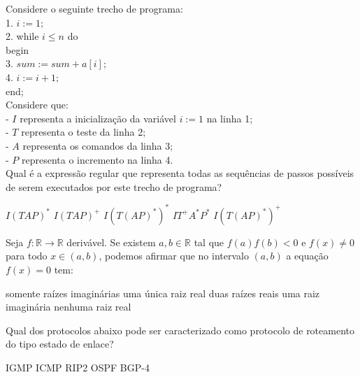 \documentclass[12pt, addpoints]{exam}
\begin{document}
\begin{questions}
\question

Considere o seguinte trecho de programa:\\

1. \( i := 1; \)\\

2. while \( i \leq n \) do\\

   begin\\

3. \( sum := sum + a[i]; \)\\

4. \( i := i + 1; \)\\

   end;\\



Considere que:\\

- \( I \) representa a inicialização da variável \( i := 1 \) na linha 1;\\

- \( T \) representa o teste da linha 2;\\

- \( A \) representa os comandos da linha 3;\\

- \( P \) representa o incremento na linha 4.\\



Qual é a expressão regular que representa todas as sequências de passos possíveis de serem executados por este trecho de programa?
\begin{choices}
\choice \( I(TAP)^* \)
\choice \( I(TAP)^+ \)
\choice \( I(T(AP)^*)^* \)
\choice \( IT^+A^*P^* \)
\choice \( I(T(AP)^*)^+ \)
\end{choices}

\question

Seja \( f : \mathbb{R} \to \mathbb{R} \) derivável. Se existem \( a, b \in \mathbb{R} \) tal que \( f(a)f(b) < 0 \) e \( f(x) \neq 0 \) para todo \( x \in (a, b) \), podemos afirmar que no intervalo \( (a, b) \) a equação \( f(x) = 0 \) tem:
\begin{choices}
\choice somente raízes imaginárias
\choice uma única raiz real
\choice duas raízes reais
\choice uma raiz imaginária
\choice nenhuma raiz real
\end{choices}

\question

Qual dos protocolos abaixo pode ser caracterizado como protocolo de roteamento do tipo estado de enlace?
\begin{choices}
\choice IGMP
\choice ICMP
\choice RIP2
\choice OSPF
\choice BGP-4
\end{choices}


\end{questions}
\end{document}

